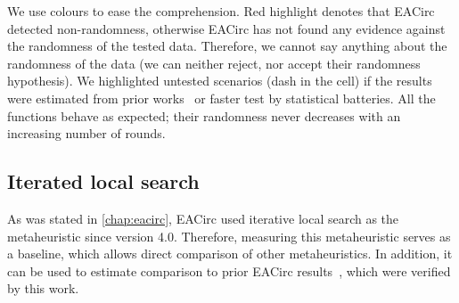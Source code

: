 \documentclass[
    digital,    %
    oneside,    %
    color,
    11pt,
    nocover,
    notable,
    nolof,
    nolot,
]{fithesis3}
\begin{document}
We use colours to ease the comprehension. Red highlight denotes that EACirc detected non-randomness, otherwise EACirc has not found any evidence against the randomness of the tested data. Therefore, we cannot say anything about the randomness of the data (we can neither reject, nor accept their randomness hypothesis). We highlighted untested scenarios (dash in the cell) if the results were estimated from prior works~\cite{svenda2013towards,sys2014constructing,kubicek2016new,ukropBcThesis} or faster test by statistical batteries. All the functions behave as expected; their randomness never decreases with an increasing number of rounds.

\subsection{Iterated local search}
\label{subsec:res-ss-ils}

As was stated in \cref{chap:eacirc}, EACirc used iterative local search as the metaheuristic since version 4.0. Therefore, measuring this metaheuristic serves as a baseline, which allows direct comparison of other metaheuristics. In addition, it can be used to estimate comparison to prior EACirc results~\cite{svenda2013towards,sys2014constructing,kubicek2016new,ukropBcThesis}, which were verified by this work.
\end{document}
